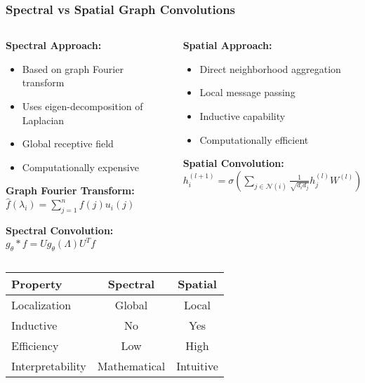 \begin{frame}[fragile]\frametitle{Spectral vs Spatial Graph Convolutions}

\begin{columns}
\begin{column}{0.5\textwidth}
\textbf{Spectral Approach:}
\begin{itemize}
\item Based on graph Fourier transform
\item Uses eigen-decomposition of Laplacian
\item Global receptive field
\item Computationally expensive
\end{itemize}

\textbf{Graph Fourier Transform:}
$\hat{f}(\lambda_i) = \sum_{j=1}^n f(j) u_i(j)$

\textbf{Spectral Convolution:}
$g_\theta * f = U g_\theta(\Lambda) U^T f$
\end{column}
\begin{column}{0.5\textwidth}
\textbf{Spatial Approach:}
\begin{itemize}
\item Direct neighborhood aggregation
\item Local message passing
\item Inductive capability
\item Computationally efficient
\end{itemize}

\textbf{Spatial Convolution:}
$h_i^{(l+1)} = \sigma\left(\sum_{j \in \mathcal{N}(i)} \frac{1}{\sqrt{d_i d_j}} h_j^{(l)} W^{(l)}\right)$
\end{column}
\end{columns}


\begin{center}
\begin{tabular}{|l|c|c|}
\hline
\textbf{Property} & \textbf{Spectral} & \textbf{Spatial} \\
\hline
Localization & Global & Local \\
Inductive & No & Yes \\
Efficiency & Low & High \\
Interpretability & Mathematical & Intuitive \\
\hline
\end{tabular}
\end{center}

\end{frame}

